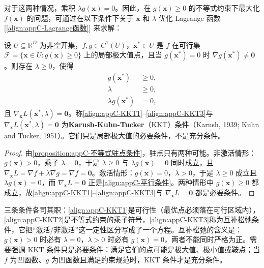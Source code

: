 \documentclass[../main.tex]{subfiles}
\begin{document}
对于这两种情况，乘积 $\lambda g(\bm{x})=0$。因此，在 $g(\bm{x})\geqslant0$ 的不等式约束下最大化 $f(\bm{x})$ 的问题，可通过在以下条件下关于 $\bm{x}$ 和 $\lambda$ 优化 Lagrange 函数 [\eqref{align:appC-Lagrange函数}] 来求解：
\begin{theorem}\label{theorem:appC-KKT}
设 $U\subseteq\mathbb{R}^{D}$ 为非空开集，$f,g\in C^{1}(U)$，$\bm{x}^{*}\in U$ 是 $f$ 在可行集 $\mathcal{F}=\{\bm{x}\in U:g(\bm{x})\geqslant0\}$ 上的局部极大值点，且当 $g(\bm{x}^{*})=0$ 时 $\nabla g(\bm{x}^{*})\neq\bm{0}$。则存在 $\lambda\geqslant0$，使得
\begin{align}
  g(\bm{x}^{*})&\geqslant0,
  \label{align:appC-KKT1}\\
  \lambda&\geqslant0,
  \label{align:appC-KKT2}\\
  \lambda g(\bm{x}^{*})&=0,
  \label{align:appC-KKT3}
\end{align}
且 $\nabla_{\bm{x}}L(\bm{x}^{*},\lambda)=\bm{0}$。称\eqref{align:appC-KKT1}--\eqref{align:appC-KKT3}与 $\nabla_{\bm{x}}L(\bm{x}^{*},\lambda)=\bm{0}$ 为\textbf{Karush-Kuhn-Tucker}（KKT）条件（Karush, 1939; Kuhn and Tucker, 1951）。它们只是局部极大值的必要条件，不是充分条件。
\end{theorem}

\begin{proof}
由\cref{proposition:appC-不等式驻点条件}，驻点只有两种可能。非激活情形：$g(\bm{x})>0$，乘子 $\lambda=0$，于是 $\lambda\geqslant0$ 与 $\lambda g(\bm{x})=0$ 同时成立，且 $\nabla_{\bm{x}}L=\nabla f+\lambda\nabla g=\nabla f=\bm{0}$。激活情形：$g(\bm{x})=0$，$\lambda>0$，于是 $\lambda\geqslant0$ 成立且 $\lambda g(\bm{x})=0$，而 $\nabla_{\bm{x}}L=\bm{0}$ 正是\eqref{align:appC-平行条件}。两种情形中 $g(\bm{x})\geqslant0$ 都成立，故\eqref{align:appC-KKT1}--\eqref{align:appC-KKT3}与 $\nabla_{\bm{x}}L=\bm{0}$ 都是必要条件。
\end{proof}

\begin{remark}
三条条件各司其职：\eqref{align:appC-KKT1}是可行性（最优点必须落在可行区域内），\eqref{align:appC-KKT2}是不等式约束的乘子符号，\eqref{align:appC-KKT3}称为互补松弛条件，它把“激活/非激活”这一定性区分写成了一个方程。互补松弛的含义是：$g(\bm{x})>0$ 时必有 $\lambda=0$，$\lambda>0$ 时必有 $g(\bm{x})=0$，两者不能同时严格为正。需要强调 KKT 条件只是必要条件：满足它们的点可能是极大值、极小值或鞍点；当 $f$ 为凹函数、$g$ 为凹函数且满足约束规范时，KKT 条件才是充分条件。
\end{remark}
\end{document}
